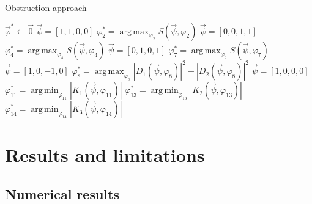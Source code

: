 \documentclass{aa}
\DeclareMathOperator*{\argmax}{arg\,max}
\DeclareMathOperator*{\argmin}{arg\,min}
\begin{document}
            \begin{algorithm}
                \caption{Obstruction approach}
                \label{obstruction}
                
                \BlankLine
                
                $\vec{\varphi}^* \leftarrow \vec{0}$ 
                \BlankLine
                $\vec{\psi} = [1, 1, 0, 0]$ 
                $\varphi_2^* = \argmax_{\varphi_2}S(\vec\psi, \varphi_2)$\;
                \BlankLine
                $\vec{\psi} = [0, 0, 1, 1]$\;
                $\varphi_4^* = \argmax_{\varphi_4}S(\vec\psi, \varphi_4)$\;
                \BlankLine
                $\vec{\psi} = [0, 1, 0, 1]$\;
                $\varphi_7^* = \argmax_{\varphi_7}S(\vec\psi, \varphi_7)$\;
                \BlankLine
                $\vec{\psi} = [1, 0, -1, 0]$\;
                $\varphi_8^* = \argmax_{\varphi_8}|D_1(\vec\psi, \varphi_8)|^2 + |D_2(\vec\psi, \varphi_8)|^2$\;
                \BlankLine
                $\vec{\psi} = [1, 0, 0, 0]$\;
                $\varphi_{11}^* = \argmin_{\varphi_{11}}\left|K_1(\vec\psi, \varphi_{11})\right|$\;
                $\varphi_{13}^* = \argmin_{\varphi_{13}}\left|K_2(\vec\psi, \varphi_{13})\right|$\;
                $\varphi_{14}^* = \argmin_{\varphi_{14}}\left|K_3(\vec\psi, \varphi_{14})\right|$\;
                
                \Return{$\vec{\varphi}^*$}
                \BlankLine
            \end{algorithm}
    
    
    \section{Results and limitations}

        \subsection{Numerical results}

            
\end{document}
